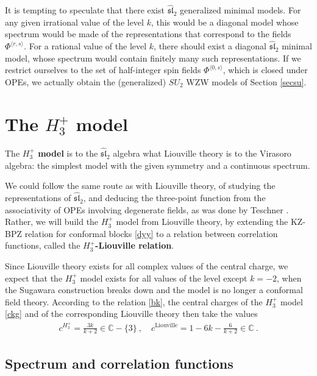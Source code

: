 \documentclass[12pt, a4paper, notitlepage, twoside]{report}
\numberwithin{equation}{section}
\theoremstyle{break}
\begin{document}
It is tempting to speculate that there exist $\widehat{\mathfrak{sl}}_2$ generalized minimal models.
For any given irrational value of the level $k$, this would be a diagonal model whose spectrum would be made of the representations that correspond to the fields $\Phi^{\langle r, s\rangle}$. For a rational value of the level $k$, there should exist a diagonal $\widehat{\mathfrak{sl}}_2$ minimal model, whose spectrum would contain finitely many such representations.
If we restrict ourselves to the set of half-integer spin fields $\Phi^{\langle 0, s\rangle}$, which is closed under OPEs, we actually obtain the (generalized) $SU_2$ WZW models of Section \ref{secsu}.


\section{The \texorpdfstring{$H_3^+$}{H3+} model\label{sechtp}}

The \textbf{\boldmath $H_3^+$ model} is to the $\widehat{\mathfrak{sl}}_2$ algebra what Liouville theory is to the Virasoro algebra: the simplest model with the given symmetry and a continuous spectrum. 

We could follow the same route as with Liouville theory, of studying the representations of $\widehat{\mathfrak{sl}}_2$, and deducing the three-point function from the associativity of OPEs involving degenerate fields, as was done by Teschner \cite{tes97a}.
Rather, we will build the $H_3^+$ model from Liouville theory, by extending the KZ-BPZ relation for conformal blocks \eqref{dyy} to a relation between correlation functions, called the \textbf{\boldmath $H_3^+$-Liouville relation}.

Since Liouville theory exists for all complex values of the central charge, we expect that the $H_3^+$ model exists for all values of the level except $k=-2$, when the Sugawara construction breaks down and the model is no longer a conformal field theory.
According to the relation \eqref{bk}, the central charges of the $H_3^+$ model \eqref{ckg} and of the corresponding Liouville theory then take the values
\begin{align}
 \boxed{c^{H_3^+} = \frac{3k}{k+2} \in \mathbb{C}-\{3\}} \ , \quad c^{\text{Liouville}} = 1-6k-\frac{6}{k+2}\in \mathbb{C}\ .
\end{align} 

\subsection{Spectrum and correlation functions}
\end{document}
